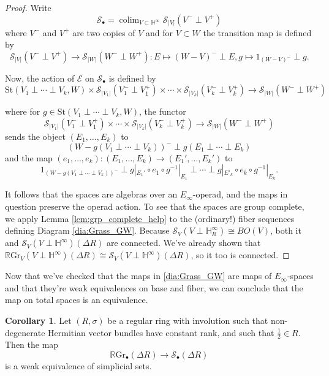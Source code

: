 \documentclass[edeposit,fullpage]{uiucthesis2009}
\newcommand{\mbb}{\mathbb}
\newcommand{\mc}{\mathcal}
\newcommand{\RGr}{\mathbb R\mathrm{Gr}}
\newcommand{\St}{\mathrm{St}}
\DeclareMathOperator*{\colim}{colim}
\theoremstyle{plain}
\numberwithin{lemma}{section}
\theoremstyle{definition}
\newtheorem{corollary}[lemma]{Corollary}
\begin{document}
\begin{proof}
Write
\[
\mc S_\bullet = \colim_{V \subset \mbb H^\infty} \mc S_{|V|}(V^- \perp V^+)
\]
where $V^-$ and $V^+$ are two copies of $V$ and for $V \subset W$ the
transition map is defined by
\[
\mc S_{|V|}(V^- \perp V^+) \rightarrow \mc S_{|W|}(W^- \perp W^+) : E
\mapsto (W-V)^- \perp E, g \mapsto 1_{(W-V)^-} \perp g.
\]

Now, the action of $\mathscr E$ on $\mc S_\bullet$ is defined by
\[
\St(V_1 \perp \cdots \perp V_k,W) \times \mc S_{|V_1|}(V_1^- \perp
V_1^+) \times \cdots \times \mc S_{|V_k|}(V_k^- \perp V_k^+)
\rightarrow \mc S_{|W|}(W^- \perp W^+)
\]

where for $g \in \St(V_1 \perp \cdots \perp V_k,W)$, the functor
\[
\mc S_{|V_1|}(V_1^- \perp V_1^+) \times \cdots \times \mc
S_{|V_k|}(V_k^- \perp V_k^+) \rightarrow \mc S_{|W|}(W^- \perp W^+)
\]
sends the object $(E_1,\dots,E_k)$ to 
\[
(W - g(V_1\perp \cdots \perp V_k))^- \perp g(E_1 \perp \cdots \perp E_k)
\]
and the map $(e_1,\dots,e_k): (E_1,\dots,E_k) \rightarrow
(E_1',\dots,E_k')$ to
\[
1_{(W - g(V_1 \perp \cdots \perp V_k))^-} \perp g|_{E_1'} \circ e_1
\circ g^{-1}|_{E_1} \perp \cdots \perp g|_{E'_k} \circ e_k \circ g^{-1}|_{E_k}.
\]

It follows that the spaces are algebras over an $E_\infty$-operad, and
the maps in question preserve the operad action. To see that the spaces are group complete, we apply Lemma \ref{lem:grp_complete_help} to
the (ordinary!) fiber sequences defining Diagram
\ref{dia:Grass_GW}. Because $\mc S_V(V \perp \mbb H^\infty_R) \cong
BO(V)$, both it and $\mc S_V(V \perp \mbb H^\infty)(\Delta R)$ are
connected. We've already shown that $\RGr_V(V \perp \mbb
H^\infty)(\Delta R) \cong \mc S_V(V \perp \mbb H^\infty)(\Delta R)$,
so it too is connected. 
\end{proof}

Now that we've checked that the maps in \ref{dia:Grass_GW} are maps of
$E_\infty$-spaces and that they're weak equivalences on base and
fiber, we can conclude that the map on total spaces is an equivalence.

\begin{corollary}\label{cor:RGr_S_eq}
Let $(R,\sigma)$ be a regular ring with involution such that
non-degenerate Hermitian vector bundles have constant rank, and such
that $\frac{1}{2} \in R$. Then the map
\[
\RGr_\bullet(\Delta R) \rightarrow \mc S_\bullet(\Delta R)
\]
is a weak equivalence of simplicial sets.
\end{corollary}
\end{document}

